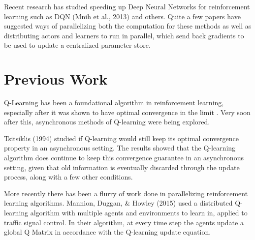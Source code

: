\documentclass[jair,twoside,11pt,theapa]{article}
\begin{document}
Recent research has studied speeding up Deep Neural Networks for reinforcement learning such as DQN (Mnih et al., 2013)\nocite{Mnih2013} and others. Quite a few papers have suggested ways of parallelizing both the computation for these methods as well as distributing actors and learners to run in parallel, which send back gradients to be used to update a centralized parameter store. 



\section{Previous Work}
\label{Literature Survey}
Q-Learning \cite{watkins} has been a foundational algorithm in reinforcement learning, especially after it was shown to have optimal convergence in the limit \cite{qlearning}. Very soon after this, asynchronous methods of Q-learning were being explored.  

Tsitsiklis (1994) \nocite{Tsitsiklis1994} studied if Q-learning would still keep its optimal convergence property in an asynchronous setting. The results showed that the Q-learning algorithm does continue to keep this convergence guarantee in an asynchronous setting, given that old information is eventually discarded through the update process, along with a few other conditions. 

More recently there has been a flurry of work done in parallelizing reinforcement learning algorithms. Mannion, Duggan, \& Howley (2015) \nocite{MANNION2015956} used a distributed Q-learning algorithm with multiple agents and environments to learn in, applied to traffic signal control. In their algorithm, at every time step the agents update a global Q Matrix in accordance with the Q-learning update equation. 
\end{document}

